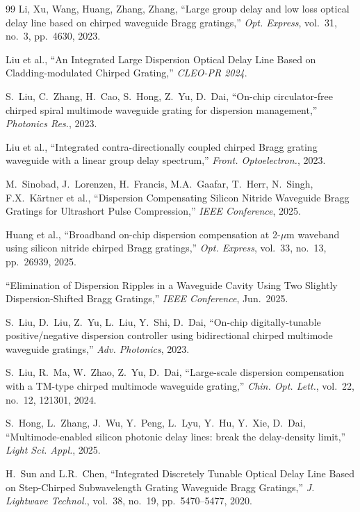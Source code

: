 \documentclass[12pt,a4paper,twoside]{article}
\begin{document}
\begin{thebibliography}{99}
Li, Xu, Wang, Huang, Zhang, Zhang,
``Large group delay and low loss optical delay line based on chirped waveguide Bragg gratings,''
\textit{Opt. Express}, vol.~31, no.~3, pp.~4630, 2023.

Liu et al.,
``An Integrated Large Dispersion Optical Delay Line Based on Cladding-modulated Chirped Grating,''
\textit{CLEO-PR 2024}.

S.~Liu, C.~Zhang, H.~Cao, S.~Hong, Z.~Yu, D.~Dai,
``On-chip circulator-free chirped spiral multimode waveguide grating for dispersion management,''
\textit{Photonics Res.}, 2023.

Liu et al.,
``Integrated contra-directionally coupled chirped Bragg grating waveguide
with a linear group delay spectrum,''
\textit{Front. Optoelectron.}, 2023.

M.~Sinobad, J.~Lorenzen, H.~Francis, M.A.~Gaafar,
T.~Herr, N.~Singh, F.X.~K\"{a}rtner et al.,
``Dispersion Compensating Silicon Nitride Waveguide Bragg Gratings for
Ultrashort Pulse Compression,''
\textit{IEEE Conference}, 2025.

Huang et al.,
``Broadband on-chip dispersion compensation at 2-$\mu$m waveband using
silicon nitride chirped Bragg gratings,''
\textit{Opt. Express}, vol.~33, no.~13, pp.~26939, 2025.

``Elimination of Dispersion Ripples in a Waveguide Cavity Using Two Slightly
Dispersion-Shifted Bragg Gratings,''
\textit{IEEE Conference}, Jun.~2025.

S.~Liu, D.~Liu, Z.~Yu, L.~Liu, Y.~Shi, D.~Dai,
``On-chip digitally-tunable positive/negative dispersion controller using
bidirectional chirped multimode waveguide gratings,''
\textit{Adv. Photonics}, 2023.

S.~Liu, R.~Ma, W.~Zhao, Z.~Yu, D.~Dai,
``Large-scale dispersion compensation with a TM-type chirped multimode waveguide grating,''
\textit{Chin. Opt. Lett.}, vol.~22, no.~12, 121301, 2024.

S.~Hong, L.~Zhang, J.~Wu, Y.~Peng, L.~Lyu, Y.~Hu, Y.~Xie, D.~Dai,
``Multimode-enabled silicon photonic delay lines: break the delay-density limit,''
\textit{Light Sci. Appl.}, 2025.

H.~Sun and L.R.~Chen,
``Integrated Discretely Tunable Optical Delay Line Based on Step-Chirped
Subwavelength Grating Waveguide Bragg Gratings,''
\textit{J. Lightwave Technol.}, vol.~38, no.~19, pp.~5470--5477, 2020.


\end{thebibliography}
\end{document}
